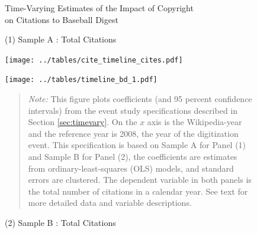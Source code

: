 \begin{figure}[!htbp]
\begin{center}
\caption{Time-Varying Estimates of the Impact of Copyright\\ on Citations to Baseball Digest}
\label{fig:ddpic}
\caption*{(1) Sample A : Total Citations}
\texttt{[image: ../tables/cite\_timeline\_cites.pdf]}
\vspace{2mm}
\caption*{(2) Sample B : Total Citations}
\texttt{[image: ../tables/timeline\_bd\_1.pdf]}

\end{center}

\begin{quote}
\emph{Note:} This figure plots coefficients (and 95 percent confidence intervals) from the event study specifications described in Section \ref{sec:timevary}. On the $x$ axis is the Wikipedia-year and the reference year is 2008, the year of the digitization event. This specification is based on Sample A for Panel (1) and Sample B for Panel (2), the coefficients are estimates from ordinary-least-squares (OLS) models, and standard errors are clustered. The dependent variable in both panels is the total number of citations in a calendar year. See text for more detailed data and variable descriptions. 

\end{quote}
\end{figure}



